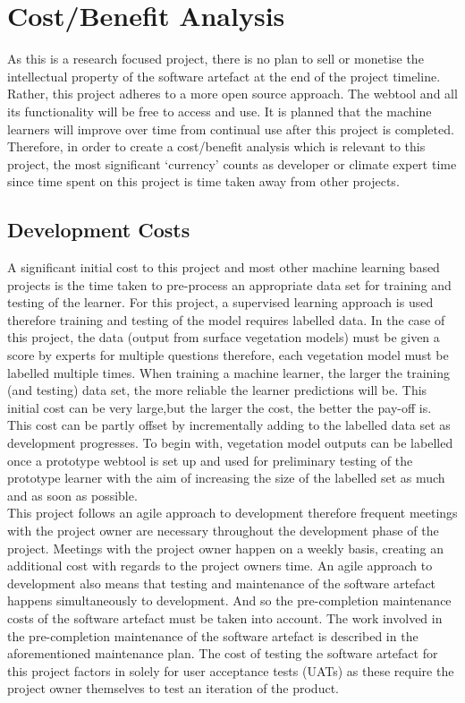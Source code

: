 \documentclass{ecmm427_assignment}
\begin{document}
\section{Cost/Benefit Analysis}
\quad As this is a research focused project, there is no plan to sell or monetise the intellectual property of the software artefact at the end of the project timeline. Rather, this project adheres to a more open source approach. The webtool and all its functionality will be free to access and use. It is planned that the machine learners will improve over time from continual use after this project is completed. Therefore, in order to create a cost/benefit analysis which is relevant to this project, the most significant ‘currency’ counts as developer or climate expert time since time spent on this project is time taken away from other projects.

\subsection{Development Costs}
\quad A significant initial cost to this project and most other machine learning based projects is the time taken to pre-process an appropriate data set for training and testing of the learner. For this project, a supervised learning approach is used therefore training and testing of the model requires labelled data. In the case of this project, the data (output from surface vegetation models) must be given a score by experts for multiple questions therefore, each vegetation model must be labelled multiple times. When training a machine learner, the larger the training (and testing) data set, the more reliable the learner predictions will be. This initial cost can be very large,but the larger the cost, the better the pay-off is. This cost can be partly offset by incrementally adding to the labelled data set as development progresses. To begin with, vegetation model outputs can be labelled once a prototype webtool is set up and used for preliminary testing of the prototype learner with the aim of increasing the size of the labelled set as much and as soon as possible.\\

\quad This project follows an agile approach to development therefore frequent meetings with the project owner are necessary throughout the development phase of the project. Meetings with the project owner happen on a weekly basis, creating an additional cost with regards to the project owners time. An agile approach to development also means that testing and maintenance of the software artefact happens simultaneously to development. And so the pre-completion maintenance costs of the software artefact must be taken into account. The work involved in the pre-completion maintenance of the software artefact is described in the aforementioned maintenance plan. The cost of testing the software artefact for this project factors in solely for user acceptance tests (UATs) as these require the project owner themselves to test an iteration of the product.\\
\end{document}

